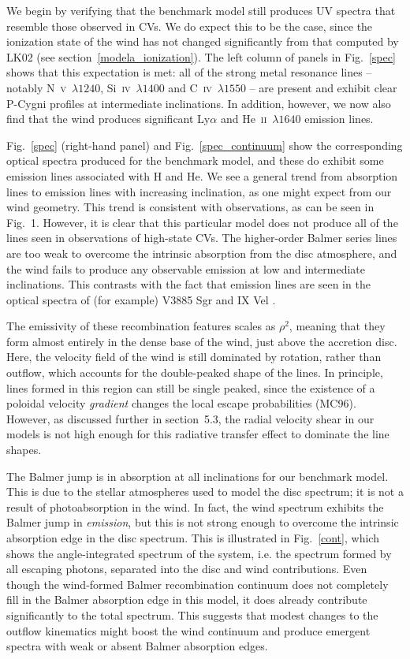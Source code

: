 We begin by verifying that the benchmark model still produces UV
spectra that resemble those observed in CVs. We do expect this to be
the case, since the ionization state of the wind has not changed
significantly from that computed by LK02 (see section~\ref{modela_ionization}). 
The left column of panels in Fig.~\ref{spec} shows that this expectation
is met: all of the strong metal resonance
lines -- notably N~\textsc{v}~$\lambda1240$,
Si~\textsc{iv}~$\lambda1400$ and C~\textsc{iv}~$\lambda1550$ -- 
are present and exhibit clear P-Cygni profiles
at intermediate inclinations. In addition, however, we now also find
that the wind produces significant Ly$\alpha$ and
He~\textsc{ii}~$\lambda1640$ emission lines. 

Fig.~\ref{spec} (right-hand panel) and Fig.~\ref{spec_continuum}
show the corresponding optical spectra produced for
the benchmark model, and these do exhibit some emission lines
associated with H and He. We see a general trend from absorption lines to emission lines 
with increasing inclination, as one might expect from our wind
geometry. This trend is consistent with observations, as can be seen
in Fig.~1. However, it is clear that this particular model
does not produce all of the lines seen in observations of high-state CVs.
The higher-order Balmer series lines are too weak
to overcome the intrinsic absorption from the disc atmosphere, and the wind 
fails to produce any observable emission at low and intermediate inclinations.
This contrasts with the fact that emission lines are seen 
in the optical spectra of (for example) V3885 Sgr \citep{hartley2005}
and IX Vel \citep[][see also Fig.~1]{beuermann1990}.

The emissivity of these recombination 
features scales as $\rho^2$, meaning that they form almost entirely in the 
dense base of the wind, just above the accretion disc. Here, the
velocity field of the wind is still dominated by rotation, rather than
outflow, which accounts for the double-peaked shape of the lines. In
principle, lines formed in this region can still be single peaked,
since the existence of a poloidal velocity {\em gradient} changes the
local escape probabilities (MC96). However, as
discussed further in section~5.3, the 
radial velocity shear in our
models is not high enough for this radiative transfer effect
to dominate the line shapes.

The Balmer jump is in absorption at all inclinations for our benchmark
model. This is due to the stellar atmospheres used to
model the disc spectrum; it is not a result of photoabsorption in the
wind. In fact, the wind spectrum exhibits the Balmer jump in {\em
emission}, but this is not strong enough to overcome the intrinsic
absorption edge in the disc spectrum. This is illustrated in
Fig.~\ref{cont}, which shows the angle-integrated spectrum of the system,
i.e. the spectrum formed by all escaping photons, separated into the
disc and wind contributions. Even though the wind-formed Balmer
recombination continuum does not completely fill in the Balmer
absorption edge in this model, it does already contribute
significantly to the total spectrum. This suggests that modest changes 
to the outflow kinematics might boost the wind continuum and produce
emergent spectra with weak or absent Balmer absorption edges. 

